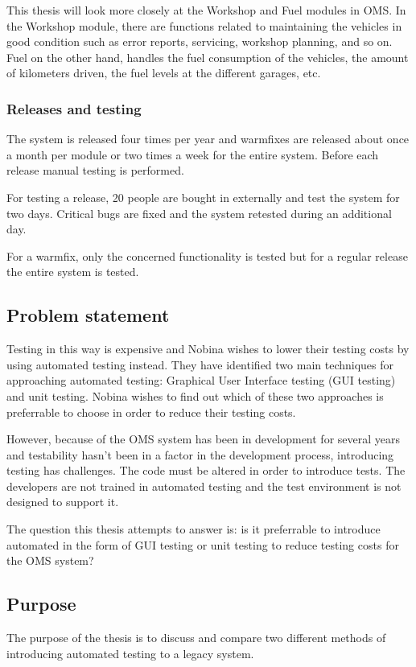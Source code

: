 \documentclass{article}
\begin{document}
		This thesis will look more closely at the Workshop and Fuel modules in OMS. In the Workshop module, there are functions related to maintaining the vehicles in good condition such as error reports, servicing, workshop planning, and so on. Fuel on the other hand, handles the fuel consumption of the vehicles, the amount of kilometers driven, the fuel levels at the different garages, etc.

		\subsubsection{Releases and testing} 
		The system is released four times per year and warmfixes are released about once a month per module or two times a week for the entire system. Before each release manual testing is performed. 

		For testing a release, 20 people are bought in externally and test the system for two days. Critical bugs are fixed and the system retested during an additional day.
		
		For a warmfix, only the concerned functionality is tested but for a regular release the entire system is tested.

	\subsection{Problem statement}
		Testing in this way is expensive and Nobina wishes to lower their testing costs by using automated testing instead. They have identified two main techniques for approaching automated testing: Graphical User Interface testing (GUI testing) and unit testing. Nobina wishes to find out which of these two approaches is preferrable to choose in order to reduce their testing costs.  

		However, because of the OMS system has been in development for several years and testability hasn't been in a factor in the development process, introducing testing has challenges. The code must be altered in order to introduce tests. The developers are not trained in automated testing and the test environment is not designed to support it.

		The question this thesis attempts to answer is: is it preferrable to introduce automated in the form of GUI testing or unit testing to reduce testing costs for the OMS system?

	\subsection{Purpose}
		The purpose of the thesis is to discuss and compare two different methods of introducing automated testing to a legacy system.
		
\end{document}
